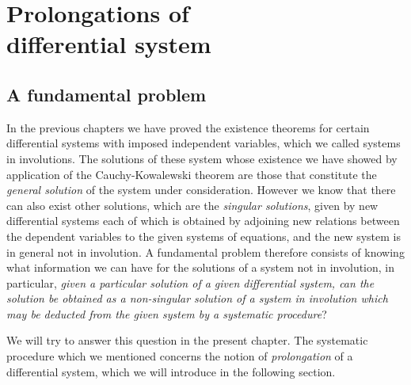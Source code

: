 \chapter[Prolongation of differential system]{Prolongations of\\differential system}
\label{cha:prol-diff-syst}

\section{A fundamental problem}
\label{sec:fundamental-problem}

\fsec In the previous chapters we have proved the existence theorems for certain differential systems with imposed independent variables, which we called systems in involutions. The solutions of these system whose existence we have showed by application of the Cauchy-Kowalewski theorem are those that constitute the \emph{general solution} of the system under consideration. However we know that there can also exist other solutions, which are the \emph{singular solutions}, given by new differential systems each of which is obtained by adjoining new relations between the dependent variables to the given systems of equations, and the new system is in general not in involution. A fundamental problem therefore consists of knowing what information we can have for the solutions of a system not in involution, in particular, \emph{given a particular solution of a given differential system, can the solution be obtained as a non-singular solution of a system in involution which may be deducted from the given system by a systematic procedure}?

We will try to answer this question in the present chapter. The systematic procedure which we mentioned concerns the notion of \emph{prolongation} of a differential system, which we will introduce in the following section.

